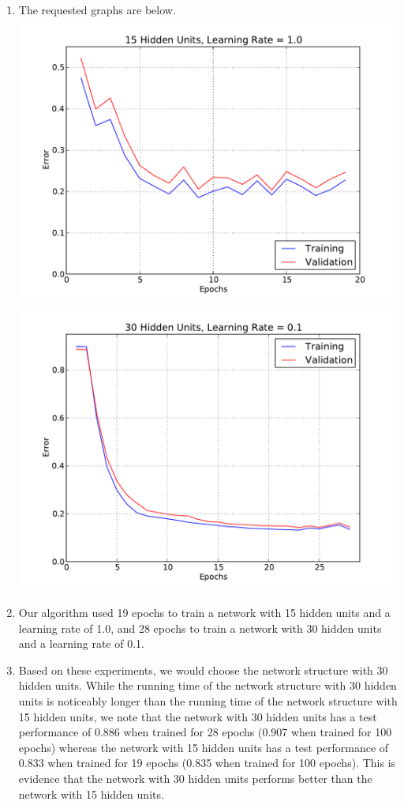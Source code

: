 \documentclass[solution, letterpaper]{cs121}
\begin{document}
\begin{enumerate}
\begin{enumerate}
			\item The requested graphs are below. \\
			\includegraphics[scale=0.7]{15-hidden-units-alpha-1_0.pdf} \\
			\includegraphics[scale=0.7]{30-hidden-units-alpha-0_1.pdf}
			\item Our algorithm used 19 epochs to train a network with 15 hidden units and a learning rate of 1.0, and 28 epochs to train a network with 30 hidden units and a learning rate of 0.1.
			\item Based on these experiments, we would choose the network structure with 30 hidden units. While the running time of the network structure with 30 hidden units is noticeably longer than the running time of the network structure with 15 hidden units, we note that the network with 30 hidden units has a test performance of 0.886 when trained for 28 epochs (0.907 when trained for 100 epochs) whereas the network with 15 hidden units has a test performance of 0.833 when trained for 19 epochs (0.835 when trained for 100 epochs). This is evidence that the network with 30 hidden units performs better than the network with 15 hidden units.

\end{enumerate}
\end{enumerate}
\end{document}
